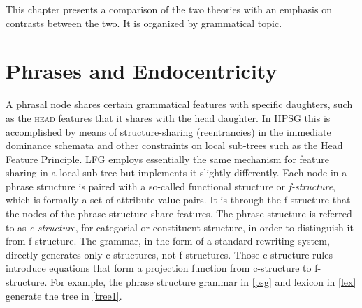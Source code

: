 \documentclass[output=paper
                ,modfonts
                ,nonflat
	        ,collection
	        ,collectionchapter
	        ,collectiontoclongg
 	        ,biblatex
                ,babelshorthands
                ,newtxmath
                ,draftmode
                ,colorlinks, citecolor=brown
]{./langsci/langscibook}
\begin{document}
This chapter presents a comparison of the two theories with an emphasis on contrasts between the two.  It is organized by grammatical topic.  


\section{Phrases and Endocentricity} 
A phrasal node shares certain grammatical features with specific daughters, such as the \textsc{head} features that it shares with the head daughter.  In HPSG this is accomplished
by means of structure-sharing (reentrancies) in the immediate dominance schemata and other 
constraints on local sub-trees such as the Head Feature Principle.  LFG employs essentially the same mechanism for feature sharing in a local sub-tree but implements it slightly differently.  Each node in a phrase structure is paired with a so-called functional structure or \textit{f-structure}, which is formally a set of attribute-value pairs.  It is through the f-structure that the nodes of the phrase structure share features.   The phrase structure is referred to as \textit{c-structure}, for categorial or constituent structure, in order to distinguish it from f-structure.  The grammar, in the form of a standard rewriting system, directly generates only c-structures, not f-structures.   Those c-structure rules introduce equations that form a projection function from c-structure to f-structure.  For example, the phrase structure grammar in \ref{psg} and lexicon in \ref{lex} generate the tree in \ref{tree1}.  

\eal  \label{psg}
\ex
{
}

\ex 

{
}

\ex 

{
}

\zl

\eal \label{lex} 
\ex 

{
\qquad{}}
\end{document}
